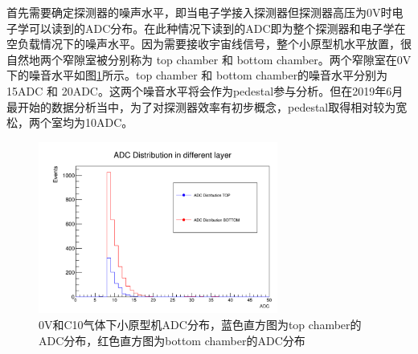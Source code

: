 首先需要确定探测器的噪声水平，即当电子学接入探测器但探测器高压为0V时电子学可以读到的ADC分布。在此种情况下读到的ADC即为整个探测器和电子学在空负载情况下的噪声水平。因为需要接收宇宙线信号，整个小原型机水平放置，很自然地两个窄隙室被分别称为 top chamber 和 bottom chamber。两个窄隙室在0V下的噪音水平如图\ref{fig:ADC_Distribution_0V}所示。top chamber 和 bottom chamber的噪音水平分别为15ADC 和 20ADC。这两个噪音水平将会作为pedestal参与分析。但在2019年6月最开始的数据分析当中，为了对探测器效率有初步概念，pedestal取得相对较为宽松，两个室均为10ADC。
\begin{figure}[htb]
    \begin{center}
    \includegraphics[width=0.7\textwidth,clip]{figures/Chapter3/ADC_Distribution_0V.png}
    \end{center}
    \caption[0V和C10气体下小原型机ADC分布]{0V和C10气体下小原型机ADC分布，蓝色直方图为top chamber的ADC分布，红色直方图为bottom chamber的ADC分布}
    \label{fig:ADC_Distribution_0V}
\end{figure}

